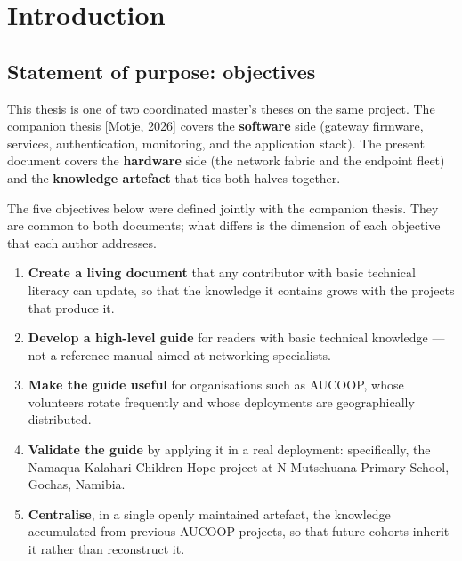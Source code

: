 
\hypertarget{introduction}{%
\section{Introduction}\label{introduction}}

\hypertarget{statement-of-purpose-objectives}{%
\subsection{Statement of purpose:
objectives}\label{statement-of-purpose-objectives}}

This thesis is one of two coordinated master's theses on the same
project. The companion thesis {[}Motje, 2026{]} covers the
\textbf{software} side (gateway firmware, services, authentication,
monitoring, and the application stack). The present document covers the
\textbf{hardware} side (the network fabric and the endpoint fleet) and
the \textbf{knowledge artefact} that ties both halves together.

The five objectives below were defined jointly with the companion
thesis. They are common to both documents; what differs is the dimension
of each objective that each author addresses.

\begin{enumerate}
\def\labelenumi{\arabic{enumi}.}
\tightlist
\item
  \textbf{Create a living document} that any contributor with basic
  technical literacy can update, so that the knowledge it contains grows
  with the projects that produce it.
\item
  \textbf{Develop a high-level guide} for readers with basic technical
  knowledge --- not a reference manual aimed at networking specialists.
\item
  \textbf{Make the guide useful} for organisations such as AUCOOP, whose
  volunteers rotate frequently and whose deployments are geographically
  distributed.
\item
  \textbf{Validate the guide} by applying it in a real deployment:
  specifically, the Namaqua Kalahari Children Hope project at N
  Mutschuana Primary School, Gochas, Namibia.
\item
  \textbf{Centralise}, in a single openly maintained artefact, the
  knowledge accumulated from previous AUCOOP projects, so that future
  cohorts inherit it rather than reconstruct it.
\end{enumerate}

